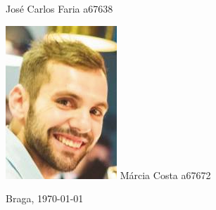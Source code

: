 \begin{titlepage}
\begin{center}
\begin{minipage}[b]{.2\textwidth}
	\small{José Carlos Faria a67638}
\end{minipage}
\hfill
\begin{minipage}[b]{.2\textwidth}
	\includegraphics[scale=0.63]{nelson}
	\small{Márcia Costa a67672}
\end{minipage}




\vspace{3ex}


\vfill

\large Braga, {\large \today}

\end{center}
\end{titlepage}

